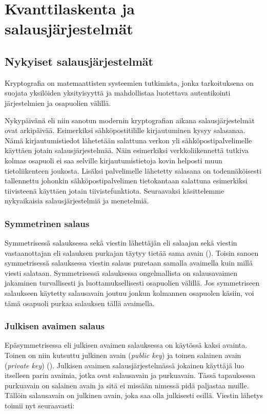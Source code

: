 \chapter{Kvanttilaskenta ja salausjärjestelmät\label{methods}}

\section{Nykyiset salausjärjestelmät}
Kryptografia on matemaattisten systeemien tutkimista, jonka tarkoituksena on suojata yksilöiden yksityisyyttä ja mahdollistaa luotettava autentikointi järjestelmien ja osapuolien välillä.

Nykypäivänä eli niin sanotun modernin kryptografian aikana salausjärjestelmät ovat arkipäivää. Esimerkiksi sähköpostitilille kirjautuminen kysyy salasanaa. Nämä kirjautumistiedot lähetetään salattuna verkon yli sähköpostipalvelimelle käyttäen jotain salausjärjestelmää. Näin esimerkiksi verkkoliikennettä tutkiva kolmas osapuoli ei saa selville kirjautumistietoja kovin helposti muun tietoliikenteen joukosta. Lisäksi palvelimelle lähetetty salasana on todennäköisesti tallennettu johonkin sähköpostipalvelimen tietokantaan salattuna esimerkiksi tiivisteenä käyttäen jotain tiivistefunktiota. Seuraavaksi käsittelemme nykyaikaisia salausjärjestelmiä ja menetelmiä.

\subsection{Symmetrinen salaus}
 Symmetrisessä salauksessa sekä viestin lähettäjän eli salaajan sekä viestin vastaanottajan eli salauksen purkajan täytyy tietää sama avain (\cite{bellare2005introduction}). Toisin sanoen symmetrisessä salauksessa viestin salaus puretaan samalla avaimella kuin millä viesti salataan.  Symmetrisessä salauksessa ongelmallista on salausavaimen jakaminen turvallisesti ja luottamuksellisesti osapuolien välillä. Jos symmetriseen salaukseen käytetty salausavain joutuu jonkun kolmannen osapuolen käsiin, voi tämä osapuoli purkaa salauksen tällä avaimella.
 
 
 
 \subsection{Julkisen avaimen salaus}
 Epäsymmetrisessa eli julkisen avaimen salauksessa on käytössä kaksi avainta. Toinen on niin kutsuttu julkinen avain (\emph{public key}) ja toinen salainen avain (\emph{private key}) (\cite{bellare2005introduction}). Julkisen avaimen salausjärjestelmässä jokainen käyttäjä luo itselleen parin avaimia, jotka ovat salausavain ja purkuavain. Tässä tapauksessa purkuavain on salainen avain ja sitä ei missään nimessä pidä paljastaa muille. Tällöin salausavain on julkinen avain, joka saa olla julkisesti esillä. Viestin lähetys toimii nyt seuraavasti:
 
